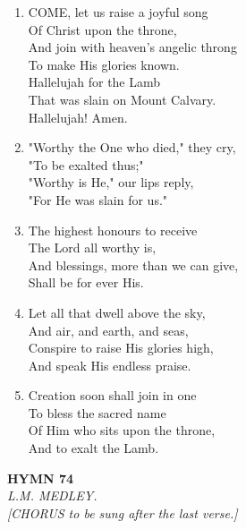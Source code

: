 \begin{enumerate}
    \item COME, let us raise a joyful song \\
        Of Christ upon the throne, \\
        And join with heaven's angelic throng \\
        To make His glories known. \\
        Hallelujah for the Lamb \\
        That was slain on Mount Calvary. \\
        Hallelujah! Amen.

    \item "Worthy the One who died," they cry, \\
        "To be exalted thus;" \\
        "Worthy is He," our lips reply, \\
        "For He was slain for us."

    \item The highest honours to receive \\
        The Lord all worthy is, \\
        And blessings, more than we can give, \\
        Shall be for ever His.

    \item Let all that dwell above the sky, \\
        And air, and earth, and seas, \\
        Conspire to raise His glories high, \\
        And speak His endless praise.

    \item Creation soon shall join in one \\
        To bless the sacred name \\
        Of Him who sits upon the throne, \\
        And to exalt the Lamb.

\end{enumerate}

\newpage
\begin{center}
    {\Large \textbf{HYMN 74}}
    \\
    \textit{L.M. MEDLEY.}
    \\
    \textit{\small [CHORUS to be sung after the last verse.]}
\end{center}
\vspace{1em}

